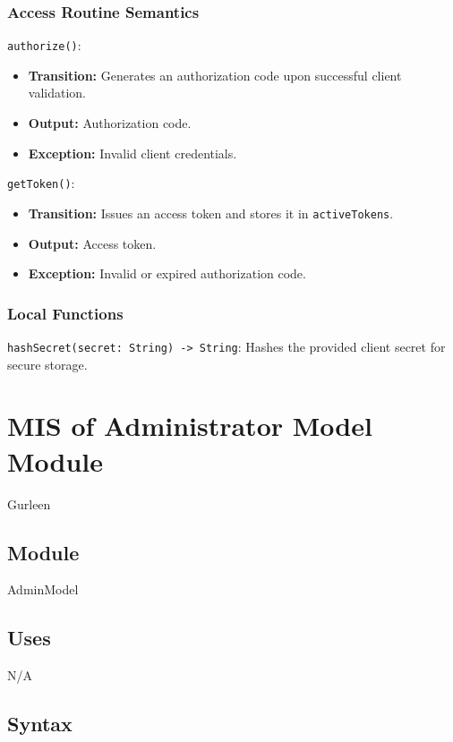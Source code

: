\documentclass[12pt, titlepage]{article}
\begin{document}
\subsubsection{Access Routine Semantics}

\noindent \texttt{authorize()}:
\begin{itemize}
    \item \textbf{Transition:} Generates an authorization code upon successful client validation.
    \item \textbf{Output:} Authorization code.
    \item \textbf{Exception:} Invalid client credentials.
\end{itemize}

\noindent \texttt{getToken()}:
\begin{itemize}
    \item \textbf{Transition:} Issues an access token and stores it in \texttt{activeTokens}.
    \item \textbf{Output:} Access token.
    \item \textbf{Exception:} Invalid or expired authorization code.
\end{itemize}

\subsubsection{Local Functions}

\texttt{hashSecret(secret: String) -> String}: Hashes the provided client secret for secure storage.

\newpage

\section{MIS of Administrator Model Module } \label{Admin_Model_Module} Gurleen

\subsection{Module}

AdminModel

\subsection{Uses}

N/A

\subsection{Syntax}
\end{document}
